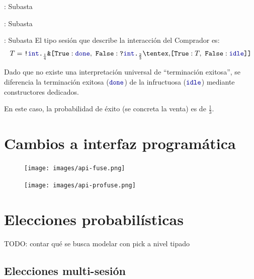 \begin{frame}{\insertsection: Subasta}
	\AuctionBuyer[basicstyle=\footnotesize]
\end{frame}

\begin{frame}{\insertsection: Subasta}
	\Auctioneer[basicstyle=\footnotesize]
\end{frame}

\begin{frame}{\insertsection: Subasta}
	El tipo sesión que describe la interacción del Comprador es:
	\begin{equation*}
	    \label{eq:refined.auction}
	    \SessionType = \Out\tint{
		\BinaryPBranch[\frac{1}{4}]\Done{
		    \In\tint{
			\BinaryPChoice[\frac{2}{3}]\T\Idle
		    }
		}
	    }
	\end{equation*}

	Dado que no existe una interpretación universal de ``terminación
	exitosa'', se diferencia la terminación exitosa ($\Done$) de la
	infructuosa ($\Idle$) mediante constructores dedicados.

	\pause
	En este caso, la probabilidad de éxito (se concreta la venta) es de $\frac{1}{3}$.
\end{frame}

\section{Cambios a interfaz programática}

\begin{frame}{\insertsection}
	\begin{figure}
		\centering
		\texttt{[image: images/api-fuse.png]}
	\end{figure}
	\begin{figure}
		\centering
		\texttt{[image: images/api-profuse.png]}
	\end{figure}
\end{frame}

\section{Elecciones probabilísticas}

\begin{frame}{\insertsection}
	TODO: contar qué se busca modelar con pick a nivel tipado
\end{frame}

\subsection{Elecciones multi-sesión}

